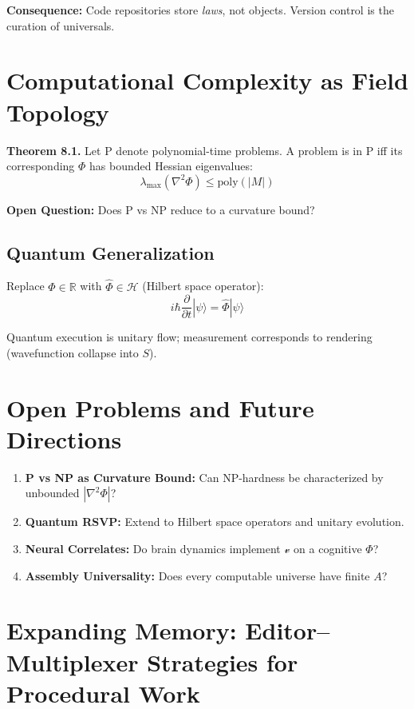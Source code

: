 \documentclass[12pt,a4paper]{article}
\theoremstyle{plain}
\theoremstyle{definition}
\theoremstyle{remark}
\newcommand{\Phifield}{\Phi}
\newcommand{\vfield}{\mathcal{v}}
\newcommand{\Sfield}{S}
\begin{document}
\textbf{Consequence:} Code repositories store \textit{laws}, not objects. Version control is the curation of universals.

\section{Computational Complexity as Field Topology}
\label{sec:complexity}

\textbf{Theorem 8.1.} Let $\text{P}$ denote polynomial-time problems. A problem is in $\text{P}$ iff its corresponding $\Phifield$ has bounded Hessian eigenvalues:
\[
\lambda_{\max}(\nabla^2 \Phifield) \leq \text{poly}(|M|)
\]

\textbf{Open Question:} Does P vs NP reduce to a curvature bound?

\subsection{Quantum Generalization}
Replace $\Phifield \in \mathbb{R}$ with $\hat{\Phifield} \in \mathcal{H}$ (Hilbert space operator):
\[
i\hbar \frac{\partial}{\partial t}|\psi\rangle = \hat{\Phifield}|\psi\rangle
\]

Quantum execution is unitary flow; measurement corresponds to rendering (wavefunction collapse into $\Sfield$).

\section{Open Problems and Future Directions}
\label{sec:open-problems}

\begin{enumerate}
\item \textbf{P vs NP as Curvature Bound:} Can NP-hardness be characterized by unbounded $|\nabla^2 \Phifield|$?
\item \textbf{Quantum RSVP:} Extend to Hilbert space operators and unitary evolution.
\item \textbf{Neural Correlates:} Do brain dynamics implement $\vfield$ on a cognitive $\Phifield$?
\item \textbf{Assembly Universality:} Does every computable universe have finite $A$?
\end{enumerate}

\section{Expanding Memory: Editor--Multiplexer Strategies for Procedural Work}
\label{sec:expanding-memory}
\end{document}
